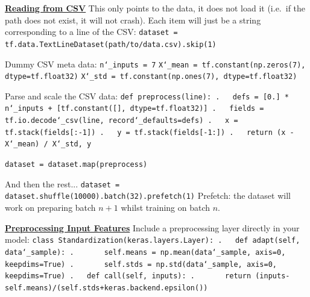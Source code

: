 \textbf{\underline{Reading from CSV}}\newline
This only points to the data, it does not load it (i.e.~if the path does not exist, it will not crash).\newline
Each item will just be a string corresponding to a line of the CSV:\newline
\texttt{dataset = tf.data.TextLineDataset(\textquotesingle path/to/data.csv\textquotesingle).skip(1)}

Dummy CSV meta data:\newline
\texttt{n\char`_inputs = 7}\newline
\texttt{X\char`_mean = tf.constant(np.zeros(7), dtype=tf.float32)}\newline
\texttt{X\char`_std = tf.constant(np.ones(7), dtype=tf.float32)}

Parse and scale the CSV data:\newline
\texttt{def preprocess(line):\newline
.~~~defs = [0.]~* n\char`_inputs + [tf.constant([], dtype=tf.float32)]\newline
.~~~fields = tf.io.decode\char`_csv(line, record\char`_defaults=defs)\newline
.~~~x = tf.stack(fields[:-1])\newline
.~~~y = tf.stack(fields[-1:])\newline
.~~~return (x - X\char`_mean) / X\char`_std, y}

\texttt{dataset = dataset.map(preprocess)}

And then the rest...\newline
\texttt{dataset = dataset.shuffle(10000).batch(32).prefetch(1)}\newline
Prefetch: the dataset will work on preparing batch $n+1$ whilst training on batch $n$.

\newpage
\textbf{\underline{Preprocessing Input Features}}\newline
Include a preprocessing layer directly in your model:\newline
\texttt{class Standardization(keras.layers.Layer):\newline
.~~~def adapt(self, data\char`_sample):\newline
.~~~~~~~self.means = np.mean(data\char`_sample, axis=0, keepdims=True)\newline
.~~~~~~~self.stds = np.std(data\char`_sample, axis=0, keepdims=True)\newline
.~~~def call(self, inputs):\newline
.~~~~~~~return (inputs-self.means)/(self.stds+keras.backend.epsilon())}

